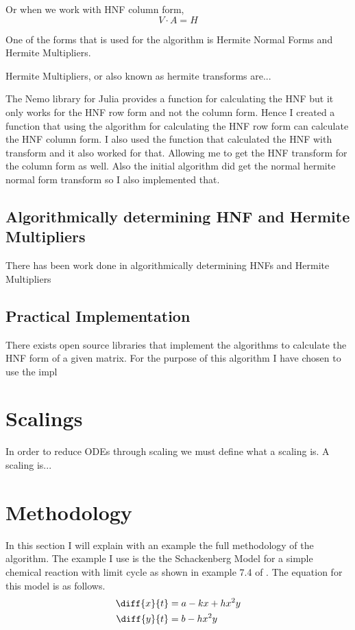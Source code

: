 \documentclass[oneside, a4paper, onecolumn, 11pt]{article}
\begin{document}
Or when we work with HNF column form,
\[V \cdot A = H\]

One of the forms that is used for the algorithm is Hermite Normal Forms and Hermite Multipliers.

Hermite Multipliers, or also known as hermite transforms are...

The Nemo library for Julia provides a function for calculating the HNF but it only works for the HNF row form and not the column form. Hence I created a function that using the algorithm for calculating the HNF row form can calculate the HNF column form. I also used the function that calculated the HNF with transform and it also worked for that. Allowing me to get the HNF transform for the column form as well. Also the initial algorithm did get the normal hermite normal form transform so I also implemented that.

\subsection{Algorithmically determining HNF and Hermite Multipliers}

There has been work done in algorithmically determining HNFs and Hermite Multipliers

\subsection{Practical Implementation}

There exists open source libraries that implement the algorithms to calculate the HNF form of a given matrix. For the purpose of this algorithm I have chosen to use the impl


\section{Scalings}

In order to reduce ODEs through scaling we must define what a scaling is. A scaling is...

\section{Methodology}


In this section I will explain with an example the full methodology of the algorithm. The example I use is the the Schackenberg Model for a simple chemical reaction with limit cycle as shown in example 7.4 of \cite{Hubert2013}. The equation for this model is as follows.
\begin{align*}
    \diff{x}{t}
     & = a - kx + hx^2y \\
    \diff{y}{t}
     & = b - h x^2 y
\end{align*}
\end{document}
